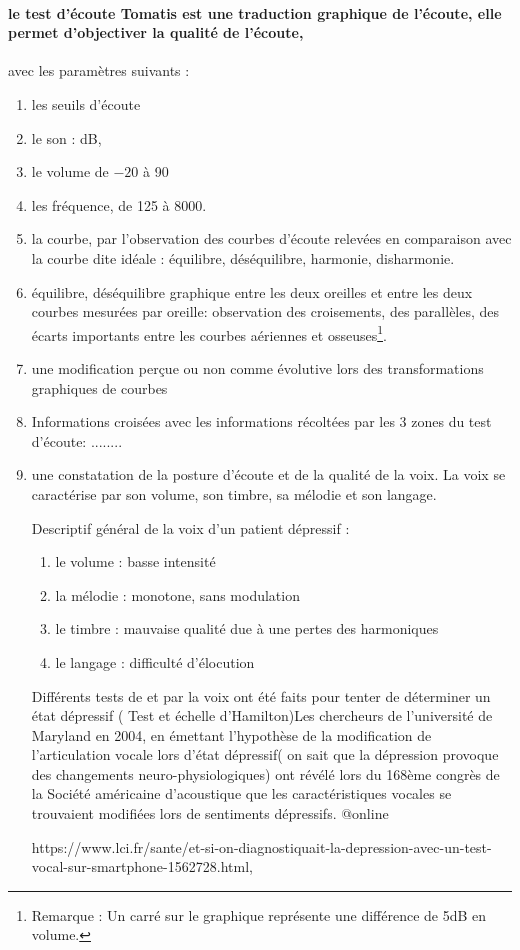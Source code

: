 \paragraph{le test d'écoute Tomatis est une traduction graphique de l'écoute, elle permet d'objectiver la qualité de l'écoute,} avec 
  les paramètres suivants : %
  \begin{enumerate}
  \item les seuils d'écoute
  \item le son : dB, 
  \item le volume de $-20$ à 90 %
  \item les fréquence, de 125 à 8000.   \label{chapitre 6.2t} %
  \item la courbe, par l'observation des courbes d'écoute relevées
    en comparaison avec la courbe dite idéale : équilibre,
    déséquilibre, harmonie, disharmonie.  
  \item équilibre, déséquilibre graphique entre les deux oreilles et entre les deux courbes mesurées par oreille: observation des croisements, des parallèles, des
      écarts importants entre les courbes aériennes et osseuses\footnote{Remarque :
      Un carré sur le graphique représente une différence de 5dB en
      volume.}.
   \item une modification perçue ou non comme évolutive lors des transformations graphiques de courbes
    \item  Informations croisées avec les informations récoltées   par les 3 zones du test d'écoute: ........
     \item une constatation de la posture d'écoute et de la qualité de
      la voix. La voix se caractérise par son volume, son timbre, sa mélodie et son langage. 
  
   Descriptif général de la voix d'un patient dépressif :
      \begin{enumerate}
        \item le volume : basse intensité
        \item la mélodie : monotone, sans modulation
        \item le timbre : mauvaise qualité due à une pertes des harmoniques
        \item le langage : difficulté d'élocution
          \end{enumerate}
   
     Différents tests de et par la voix ont été faits pour tenter de déterminer un état dépressif ( Test et échelle d'Hamilton)Les chercheurs de l'université de Maryland en 2004, en émettant l'hypothèse de la modification de l'articulation vocale lors d'état dépressif( on sait que la dépression provoque des changements  neuro-physiologiques) ont révélé lors du 168ème congrès de la Société américaine d'acoustique que les caractéristiques vocales se trouvaient modifiées lors de sentiments dépressifs. @online{https://www.lci.fr/sante/et-si-on-diagnostiquait-la-depression-avec-un-test-vocal-sur-smartphone-1562728.html,
     
}
\end{enumerate}
